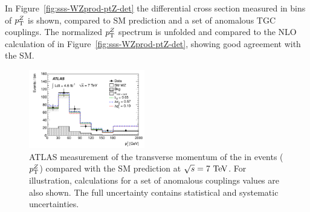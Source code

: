 \begin{table}[htp]
\begin{center}
\caption{Summary of measured fiducial and total $\WZ$ production cross sections from ATLAS 
at 7 TeV center-of-mass energies in the $\ll\lnu$ final state. The fiducial definitions differ from the 7 and 8 TeV analysis. Furthermore, the 7 TeV analysis
quotes the sum for the $e$ and $\mu$ channels, the 8 TeV analysis quotes the combination of channels. Thus, the two fiducial cross sections cannot be 
compared directly.}
\end{center}
\label{tab:sss-WZprod-xsec}
\end{table}%


In Figure~\ref{fig:sss-WZprod-ptZ-det} the differential cross section measured in bins of 
$p_{\mathrm{T}}^Z$ is shown, compared to SM prediction and a set of anomalous TGC couplings. 
The normalized $p_{\mathrm{T}}^Z$ spectrum is unfolded and compared to the NLO calculation of \mcatnlo in 
Figure~\ref{fig:sss-WZprod-ptZ-det}, showing good agreement with the SM.


\begin{figure}[htbp]
  \begin{center}
  \includegraphics[width=0.45\textwidth]{figures/sss-inclboson-diboson-wzprod-ptZ-det.pdf}
  \caption{ATLAS measurement of the transverse momentum of the \Zboson in \WZ events ($p_{\mathrm{T}}^Z$) compared with the SM prediction at $\rts = 7\TeV$. For illustration, calculations for a set of anomalous couplings values are also shown. The full uncertainty contains statistical and systematic uncertainties.}
\label{fig:sss-WZprod-ptZ}
\end{center}
\end{figure}

